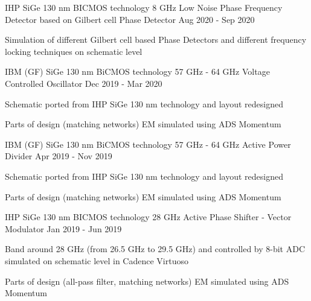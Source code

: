 \begin{cventries}

\cventry
{IHP SiGe 130 nm BICMOS technology} %
{8 GHz Low Noise Phase Frequency Detector based on Gilbert cell} %
{Phase Detector} %
{Aug 2020 - Sep 2020} %
{ %
\begin{cvitems}
\item {Simulation of different Gilbert cell based Phase Detectors and different frequency locking techniques on schematic level}
\end{cvitems} 
}


\cventry
{IBM (GF) SiGe 130 nm BiCMOS technology} %
{57 GHz - 64 GHz Voltage Controlled Oscillator} %
{} %
{Dec 2019 - Mar 2020} %
{ %
\begin{cvitems}
\item {Schematic ported from IHP SiGe 130 nm technology and layout redesigned}
\item {Parts of design (matching networks) EM simulated using ADS Momentum}
\end{cvitems} 
}


\cventry
{IBM (GF) SiGe 130 nm BiCMOS technology} %
{57 GHz - 64 GHz Active Power Divider} %
{} %
{Apr 2019 - Nov 2019} %
{ %
\begin{cvitems}
\item {Schematic ported from IHP SiGe 130 nm technology and layout redesigned}
\item {Parts of design (matching networks) EM simulated using ADS Momentum}
\end{cvitems} 
}


\cventry
{IHP SiGe 130 nm BICMOS technology} %
{28 GHz Active Phase Shifter - Vector Modulator} %
{} %
{Jan 2019 - Jun 2019} %
{ %
\begin{cvitems}
\item {Band around 28 GHz (from 26.5 GHz to 29.5 GHz) and controlled by 8-bit ADC simulated on schematic level in Cadence Virtuoso}
\item {Parts of design (all-pass filter, matching networks) EM simulated using ADS Momentum}
\end{cvitems} 
}


\end{cventries}
